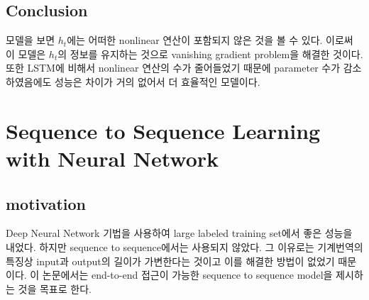 \documentclass[extendedabs]{bmvc2k}
\begin{document}
 \subsection{Conclusion}
 \quad 모델을 보면 $h_t$에는 어떠한 nonlinear 연산이 포함되지 않은 것을 볼 수 있다. 이로써 이 모델은 $h_t$의 정보를 유지하는 것으로 vanishing gradient problem을 해결한 것이다.
 또한 LSTM에 비해서 nonlinear 연산의 수가 줄어들었기 때문에 parameter 수가 감소하였음에도 성능은 차이가 거의 없어서 더 효율적인 모델이다.

 \section{Sequence to Sequence Learning with Neural Network\cite{sutskever2014sequence}}
 \subsection{motivation}
 \quad Deep Neural Network 기법을 사용하여 large labeled training set에서 좋은 성능을 내었다. 하지만 sequence to sequence에서는 사용되지 않았다.
 그 이유로는 기계번역의 특징상 input과 output의 길이가 가변한다는 것이고 이를 해결한 방법이 없었기 때문이다. 이 논문에서는 end-to-end 접근이 가능한
 sequence to sequence model을 제시하는 것을 목표로 한다. 
\end{document}
